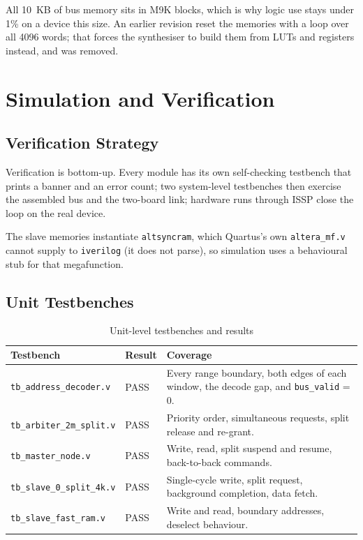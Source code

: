 \documentclass[11pt,a4paper]{article}
\newcommand{\sig}[1]{\texttt{#1}}
\begin{document}
All 10~KB of bus memory sits in M9K blocks, which is why logic use stays under
1\% on a device this size. An earlier revision reset the memories with a loop
over all 4096 words; that forces the synthesiser to build them from LUTs and
registers instead, and was removed.

\section{Simulation and Verification}

\subsection{Verification Strategy}

Verification is bottom-up. Every module has its own self-checking testbench that
prints a banner and an error count; two system-level testbenches then exercise
the assembled bus and the two-board link; hardware runs through ISSP close the
loop on the real device.

The slave memories instantiate \sig{altsyncram}, which Quartus's own
\sig{altera\_mf.v} cannot supply to \sig{iverilog} (it does not parse), so
simulation uses a behavioural stub for that megafunction.

\subsection{Unit Testbenches}

\begin{table}[htbp]
\centering
\caption{Unit-level testbenches and results}
\label{tab:unittb}
\small
\begin{tabularx}{\textwidth}{llX}
\toprule
\textbf{Testbench} & \textbf{Result} & \textbf{Coverage} \\
\midrule
\sig{tb\_address\_decoder.v}   & PASS & Every range boundary, both edges of each window, the decode gap, and \sig{bus\_valid} = 0. \\
\sig{tb\_arbiter\_2m\_split.v} & PASS & Priority order, simultaneous requests, split release and re-grant. \\
\sig{tb\_master\_node.v}       & PASS & Write, read, split suspend and resume, back-to-back commands. \\
\sig{tb\_slave\_0\_split\_4k.v}& PASS & Single-cycle write, split request, background completion, data fetch. \\
\sig{tb\_slave\_fast\_ram.v}   & PASS & Write and read, boundary addresses, deselect behaviour. \\
\bottomrule
\end{tabularx}
\end{table}
\end{document}
